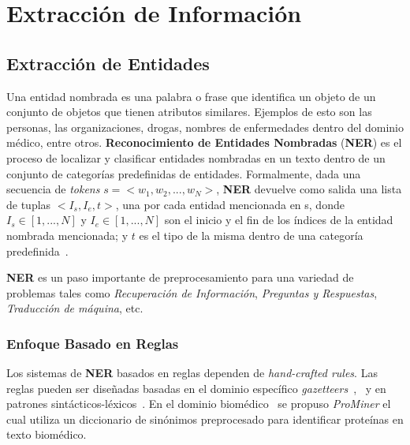 \chapter{Extracción de Información}\label{chapter:information_extraction}

\section{Extracción de Entidades}

Una entidad nombrada es una palabra o frase que identifica un objeto de un conjunto de objetos que tienen atributos similares. Ejemplos de esto son las personas, las organizaciones, drogas, nombres de enfermedades dentro del dominio m\'edico, entre otros. \textbf{Reconocimiento de Entidades Nombradas} (\textbf{NER}) es el proceso de localizar y clasificar entidades nombradas en un texto dentro de un conjunto de categor\'ias predefinidas de entidades.
Formalmente, dada una secuencia de \emph{tokens} $s=<w_1, w_2, ..., w_N >$, \textbf{NER} devuelve como salida una lista de tuplas $<I_s, I_e, t>$, una por cada entidad mencionada en s, donde $I_s \in [1,...,N]$ y $I_e \in [1,...,N]$ son el inicio y el fin de los \'indices de la entidad nombrada mencionada; y $t$ es el tipo de la misma dentro de una categor\'ia predefinida~\cite{li2018survey}. 

\textbf{NER} es un paso importante de preprocesamiento para una variedad de problemas tales como \emph{Recuperaci\'on de Informaci\'on}, \emph{Preguntas y Respuestas}, \emph{Traducci\'on de m\'aquina}, etc.


\subsection{Enfoque Basado en Reglas}

Los sistemas de \textbf{NER} basados en reglas dependen de \emph{hand-crafted rules}. Las reglas pueden ser dise\~nadas basadas en el dominio espec\'ifico \emph{gazetteers}~\cite{etzioni2005unsupervised},~\cite{sekine2004definition} y en patrones sint\'acticos-l\'exicos~\cite{zhang2013unsupervised}. En el dominio biom\'edico~\cite{hanisch2005prominer} se propuso \emph{ProMiner} el cual utiliza un diccionario de sin\'onimos preprocesado para identificar prote\'inas en texto biom\'edico.

